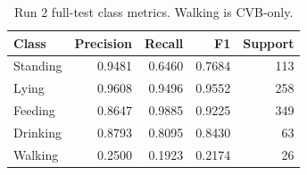 \begin{table}[htbp]
\centering\small
\caption[Run 2 Behavior per-class results]{Run 2 full-test class metrics. Walking is CVB-only.}\label{tab:behresults}
\begin{tabular}{lrrrr}
\toprule
Class & Precision & Recall & F1 & Support \\
\midrule
Standing & 0.9481 & 0.6460 & 0.7684 & 113 \\
Lying & 0.9608 & 0.9496 & 0.9552 & 258 \\
Feeding & 0.8647 & 0.9885 & 0.9225 & 349 \\
Drinking & 0.8793 & 0.8095 & 0.8430 & 63 \\
Walking & 0.2500 & 0.1923 & 0.2174 & 26 \\
\bottomrule
\end{tabular}
\end{table}
